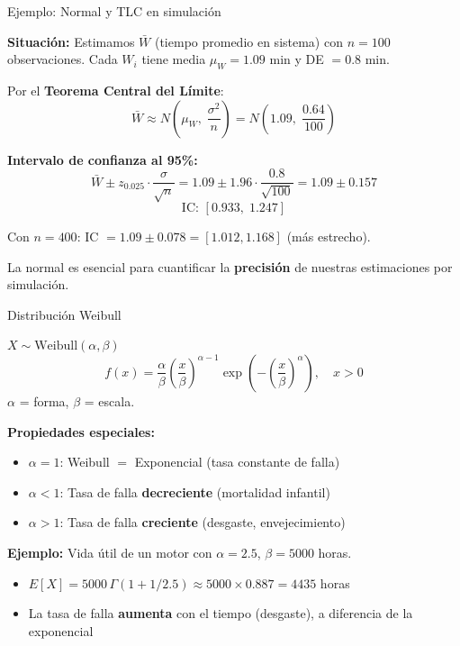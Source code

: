 \documentclass[aspectratio=1610, 9pt]{beamer}
\begin{document}
\begin{frame}{Ejemplo: Normal y TLC en simulaci\'{o}n}

\textbf{Situaci\'{o}n:} Estimamos $\bar{W}$ (tiempo promedio en sistema) con $n=100$ observaciones. Cada $W_i$ tiene media $\mu_W = 1.09$ min y DE $= 0.8$ min.

\vspace{0.3cm}
Por el \textbf{Teorema Central del L\'{i}mite}:
\[
\bar{W} \approx N\!\left(\mu_W,\; \frac{\sigma^2}{n}\right) = N\!\left(1.09,\; \frac{0.64}{100}\right)
\]

\vspace{0.2cm}
\textbf{Intervalo de confianza al 95\%:}
\[
\bar{W} \pm z_{0.025}\cdot\frac{\sigma}{\sqrt{n}} = 1.09 \pm 1.96 \cdot \frac{0.8}{\sqrt{100}} = 1.09 \pm 0.157
\]
\[
\text{IC: } [0.933, \; 1.247]
\]

\vspace{0.2cm}
Con $n = 400$: IC $= 1.09 \pm 0.078 = [1.012, 1.168]$ (m\'{a}s estrecho).

\vspace{0.2cm}
La normal es esencial para cuantificar la \textbf{precisi\'{o}n} de nuestras estimaciones por simulaci\'{o}n.
\end{frame}

\begin{frame}{Distribuci\'{o}n Weibull}

\begin{block}{$X \sim \text{Weibull}(\alpha, \beta)$}
\[
f(x) = \frac{\alpha}{\beta}\left(\frac{x}{\beta}\right)^{\alpha-1}\exp\!\left(-\left(\frac{x}{\beta}\right)^{\alpha}\right), \quad x > 0
\]
$\alpha$ = forma, $\beta$ = escala.
\end{block}

\vspace{0.2cm}
\textbf{Propiedades especiales:}
\begin{itemize}
    \item $\alpha = 1$: Weibull $= $ Exponencial (tasa constante de falla)
    \item $\alpha < 1$: Tasa de falla \textbf{decreciente} (mortalidad infantil)
    \item $\alpha > 1$: Tasa de falla \textbf{creciente} (desgaste, envejecimiento)
\end{itemize}

\vspace{0.3cm}
\textbf{Ejemplo:} Vida \'{u}til de un motor con $\alpha = 2.5$, $\beta = 5000$ horas.
\begin{itemize}
    \item $E[X] = 5000\,\Gamma(1 + 1/2.5) \approx 5000 \times 0.887 = 4435$ horas
    \item La tasa de falla \textbf{aumenta} con el tiempo (desgaste), a diferencia de la exponencial
\end{itemize}
\end{frame}
\end{document}
